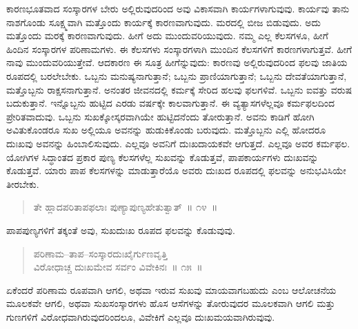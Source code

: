 ಕಾರಣಭೂತವಾದ ಸಂಸ್ಕಾರಗಳ ಬೇರು ಅಲ್ಲಿರುವುದರಿಂದ ಅವು ವಿಕಾಸವಾಗಿ ಕಾರ್ಯಗಳಾಗುವುವು. ಕಾರ್ಯವು ತಾನು ನಾಶಗೊಂಡು ಸೂಕ್ಷ್ಮವಾಗಿ ಮತ್ತೊಂದು ಕಾರ್ಯಕ್ಕೆ ಕಾರಣವಾಗುವುದು. ಮರದಲ್ಲಿ ಬೀಜ ಬಿಡುವುದು. ಅದು ಮತ್ತೊಂದು ಮರಕ್ಕೆ ಕಾರಣವಾಗುವುದು. ಹೀಗೆ ಅದು ಮುಂದುವರಿಯುವುದು. ನಮ್ಮ ಎಲ್ಲ ಕೆಲಸಗಳೂ, ಹೀಗೆ ಹಿಂದಿನ ಸಂಸ್ಕಾರಗಳ ಪರಿಣಾಮಗಳು. ಈ ಕೆಲಸಗಳು ಸಂಸ್ಕಾರಗಳಾಗಿ ಮುಂದಿನ ಕೆಲಸಗಳಿಗೆ ಕಾರಣಗಳಾಗುತ್ತವೆ. ಹೀಗೆ ನಾವು ಮುಂದುವರಿಯುತ್ತೇವೆ. ಆದಕಾರಣ ಈ ಸೂತ್ರ ಹೀಗೆನ್ನುವುದು: ಕಾರಣವು ಅಲ್ಲಿರುವುದರಿಂದ ಫಲವು ಜಾತಿಯ ರೂಪದಲ್ಲಿ ಬರಲೇಬೇಕು. ಒಬ್ಬನು ಮನುಷ್ಯನಾಗುತ್ತಾನೆ; ಒಬ್ಬನು ಪ್ರಾಣಿಯಾಗುತ್ತಾನೆ; ಒಬ್ಬನು ದೇವತೆಯಾಗುತ್ತಾನೆ, ಮತ್ತೊಬ್ಬನು ರಾಕ್ಷಸನಾಗುತ್ತಾನೆ. ಅನಂತರ ಜೀವನದಲ್ಲಿ ಕರ್ಮಕ್ಕೆ ಸೇರಿದ ಹಲವು ಫಲಗಳಿವೆ. ಒಬ್ಬನು ಐವತ್ತು ವರುಷ ಬದುಕುತ್ತಾನೆ. ಇನ್ನೊಬ್ಬನು ಹುಟ್ಟಿದ ಎರಡು ವರ್ಷಕ್ಕೇ ಕಾಲವಾಗುತ್ತಾನೆ. ಈ ವ್ಯತ್ಯಾಸಗಳೆಲ್ಲವೂ ಕರ್ಮಫಲದಿಂದ ಪ್ರೇರಿತವಾದುವು. ಒಬ್ಬನು ಸುಖಕ್ಕೋಸ್ಕರವಾಗಿಯೇ ಹುಟ್ಟಿದನೆಂದು ತೋರುತ್ತಾನೆ. ಅವನು ಕಾಡಿಗೆ ಹೋಗಿ ಅವಿತುಕೊಂಡರೂ ಸುಖ ಅಲ್ಲಿಯೂ ಅವನನ್ನು ಹುಡುಕಿಕೊಂಡು ಬರುವುದು. ಮತ್ತೊಬ್ಬನು ಎಲ್ಲಿ ಹೋದರೂ ದುಃಖವು ಅವನನ್ನು ಹಿಂಬಾಲಿಸುವುದು. ಎಲ್ಲವೂ ಅವನಿಗೆ ದುಃಖದಾಯಕವೇ ಆಗುತ್ತದೆ. ಎಲ್ಲವೂ ಅವರ ಕರ್ಮಫಲ. ಯೋಗಿಗಳ ಸಿದ್ಧಾಂತದ ಪ್ರಕಾರ ಪುಣ್ಯ ಕೆಲಸಗಳೆಲ್ಲ ಸುಖವನ್ನು ಕೊಡುತ್ತವೆ, ಪಾಪಕಾರ್ಯಗಳು ದುಃಖವನ್ನು ಕೊಡುತ್ತವೆ. ಯಾರು ಪಾಪ ಕೆಲಸಗಳನ್ನು ಮಾಡುತ್ತಾರೆಯೊ ಅವರು ದುಃಖದ ರೂಪದಲ್ಲಿ ಫಲವನ್ನು ಅನುಭವಿಸಿಯೇ ತೀರಬೇಕು. 

\vspace{-0.3cm}

\begin{verse}
ತೇ ಹ್ಲಾದಪರಿತಾಪಫಲಾಃ ಪುಣ್ಯಾಪುಣ್ಯಹೇತುತ್ವಾತ್​~॥ ೧೪~॥
\end{verse}

\vspace{-0.3cm}

ಪಾಪಪುಣ್ಯಗಳಿಗೆ ತಕ್ಕಂತೆ ಅವು, ಸುಖದುಃಖ ರೂಪದ ಫಲವನ್ನು ಕೊಡುವುವು. 

\vspace{-0.3cm}

\begin{verse}
ಪರಿಣಾಮ–ತಾಪ–ಸಂಸ್ಕಾರದುಃಖೈರ್ಗುಣವೃತ್ತಿ\\ವಿರೋಧಾಚ್ಚ ದುಃಖಮೇವ ಸರ್ವಂ ವಿವೇಕಿನಃ~॥ ೧೫~॥
\end{verse}

\vspace{-0.3cm}

ಏಕೆಂದರೆ ಪರಿಣಾಮ ರೂಪವಾಗಿ ಆಗಲಿ, ಅಥವಾ ಇರುವ ಸುಖವು ಮಾಯವಾಗಬಹುದು ಎಂಬ ಆಲೋಚನೆಯ ಮೂಲಕವೇ ಆಗಲಿ, ಅಥವಾ ಸುಖಸಂಸ್ಕಾರಗಳು ಹೊಸ ಆಸೆಗಳನ್ನು ತೋರುವುದರ ಮೂಲಕವಾಗಿ ಆಗಲಿ ಮತ್ತು ಗುಣಗಳಿಗೆ ವಿರೋಧವಾಗಿರುವುದರಿಂದಲೂ, ವಿವೇಕಿಗೆ ಎಲ್ಲವೂ ದುಃಖಮಯವಾಗಿರುವುವು. 

